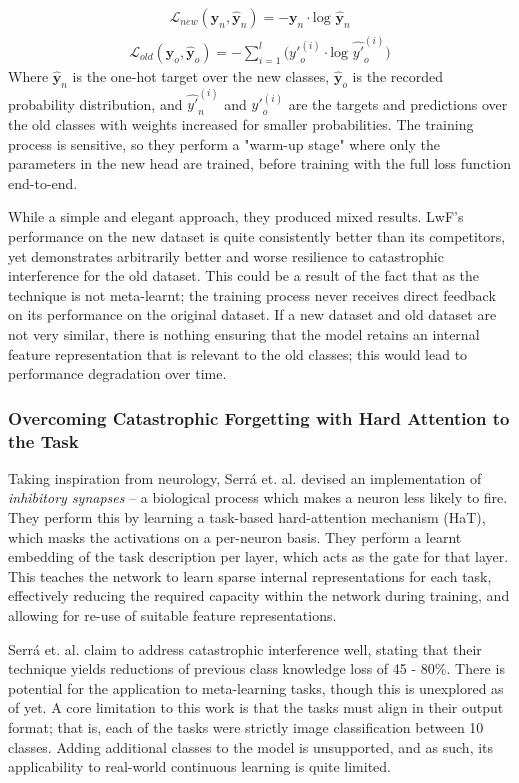 \documentclass{report}
\begin{document}
\begin{align} \label{eqn:lwf:1}
 \mathcal{L}_{new}(\bm{y}_n,\hat{\bm{y}}_n) = -\bm{y}_n \cdot \text{log } \bm{\hat{y}}_n
\end{align}
\begin{align} \label{eqn:lwf:2}
 \mathcal{L}_{old}(\bm{y}_o,\hat{\bm{y}}_o) = -\sum_{i=1}^{l}\big( {y'}_{o}^{(i)} \cdot \text{log } \hat{y'}_o^{(i)}\big)
\end{align}
Where $\bm{\hat{y}}_n$ is the one-hot target over the new classes, $\bm{\hat{y}}_o$ is the recorded probability distribution, and $\hat{y'}_n^{(i)}$ and ${y'}_{o}^{(i)}$ are the targets and predictions over the old classes with weights increased for smaller probabilities. The training process is sensitive, so they perform a "warm-up stage" where only the parameters in the new head are trained, before training with the full loss function end-to-end. \par
While a simple and elegant approach, they produced mixed results. LwF's performance on the new dataset is quite consistently better than its competitors, yet demonstrates arbitrarily better and worse resilience to catastrophic interference for the old dataset. This could be a result of the fact that as the technique is not meta-learnt; the training process never receives direct feedback on its performance on the original dataset. If a new dataset and old dataset are not very similar, there is nothing ensuring that the model retains an internal feature representation that is relevant to the old classes; this would lead to performance degradation over time. \par

\subsubsection{Overcoming Catastrophic Forgetting with Hard Attention to the Task}
Taking inspiration from neurology, Serr\'a et. al. \parencite{hat} devised an implementation of \emph{inhibitory synapses} -- a biological process which makes a neuron less likely to fire. They perform this by learning a task-based hard-attention mechanism (HaT), which masks the activations on a per-neuron basis. They perform a learnt embedding of the task description per layer, which acts as the gate for that layer. This teaches the network to learn sparse internal representations for each task, effectively reducing the required capacity within the network during training, and allowing for re-use of suitable feature representations. \par
Serr\'a et. al. claim to address catastrophic interference well, stating that their technique yields reductions of previous class knowledge loss of 45 - 80\%. There is potential for the application to meta-learning tasks, though this is unexplored as of yet. A core limitation to this work is that the tasks must align in their output format; that is, each of the tasks were strictly image classification between 10 classes. Adding additional classes to the model is unsupported, and as such, its applicability to real-world continuous learning is quite limited. \par
\end{document}
